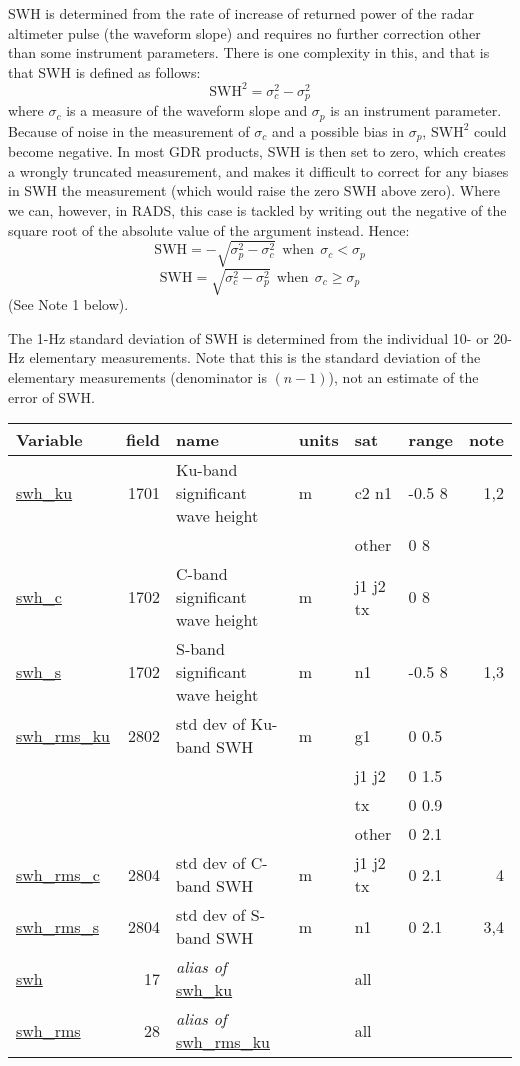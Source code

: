 \documentclass[a4paper,11pt,openany,natbib]{thesis}
\makeatletter
\newcommand\var[1]{\url{#1}\index{variables!#1@\protect\url{#1}}}
\newcommand\alias[1]{\emph{alias of} \var{#1}}
\newenvironment{vartable}{
\begin{table}[ht]
\small
\begin{tabular}{lrllllr}
\hline
Variable & field & name & units & sat & range & note \\
\hline
}{
\hline
\end{tabular}
\end{table}
}
\makeatother
\begin{document}
SWH is determined from the rate of increase of returned power of the radar altimeter pulse (the waveform slope) and requires no further correction other than some instrument parameters. There is one complexity in this, and that is that SWH is defined as follows:
$$ \mathrm{SWH}^2 = \sigma_c^2 - \sigma_p^2 $$
where $\sigma_c$ is a measure of the waveform slope and $\sigma_p$ is an instrument parameter. Because of noise in the measurement of $\sigma_c$ and a possible bias in $\sigma_p$, $\mathrm{SWH}^2$ could become negative. In most GDR products, SWH is then set to zero, which creates a wrongly truncated measurement, and makes it difficult to correct for any biases in SWH the measurement (which would raise the zero SWH above zero). Where we can, however, in RADS, this case is tackled by writing out the negative of the square root of the absolute value of the argument instead. Hence:
$$ \mathrm{SWH} = - \sqrt{\sigma_p^2 - \sigma_c^2} \mathrm{~~when~~} \sigma_c < \sigma_p $$
$$ \mathrm{SWH} = \sqrt{\sigma_c^2 - \sigma_p^2} \mathrm{~~when~~} \sigma_c \ge \sigma_p $$
(See Note 1 below).

The 1-Hz standard deviation of SWH is determined from the individual 10- or 20-Hz elementary measurements. Note that this is the standard deviation of the elementary measurements (denominator is $(n-1)$), not an estimate of the error of SWH.

\begin{vartable}
\var{swh_ku} & 1701 & Ku-band significant wave height & m & c2 n1 & -0.5 8 & 1,2 \\
& & & & other & 0 8 & \\
\var{swh_c} & 1702 & C-band significant wave height & m & j1 j2 tx & 0 8 & \\
\var{swh_s} & 1702 & S-band significant wave height & m & n1 & -0.5 8 & 1,3 \\
\var{swh_rms_ku} & 2802 & std dev of Ku-band SWH & m & g1 & 0 0.5 & \\
& & & & j1 j2 & 0 1.5 & \\
& & & & tx & 0 0.9 & \\
& & & & other & 0 2.1 & \\
\var{swh_rms_c} & 2804 & std dev of C-band SWH & m & j1 j2 tx & 0 2.1 & 4 \\
\var{swh_rms_s} & 2804 & std dev of S-band SWH & m & n1 & 0 2.1 & 3,4 \\
\hline
\var{swh} & 17 & \alias{swh_ku} && all && \\
\var{swh_rms} & 28 & \alias{swh_rms_ku} && all && \\
\end{vartable}
\end{document}
